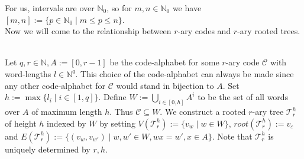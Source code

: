 \documentclass[12pt]{article}
\newcommand{\T}[0]{{\mathcal{T}_r^h}}
\newcommand{\ro}[0]{\textit{root}}
\newenvironment{statement3}[3]{\begin{trivlist}
\item[\hskip \labelsep {\bfseries #1}\hskip \labelsep {\bfseries #2} {#3}\textbf{.}]}{\end{trivlist}}
\begin{document}
For us, intervals are over $\mathbb{N}_0$, so for $m,n \in \mathbb{N}_0$ we have $[m,n] := \{p \in \mathbb{N}_0 \mid
m \leq p \leq n\}$.\\
Now we will come to the relationship between $r$-ary codes and $r$-ary rooted trees.

\begin{statement3}{(1.4)}{Definition}{(r-ary Trees from r-ary Codes)}\strut\\[2pt]
    Let $q,r \in \mathbb{N}, A := [0,r-1]$ be the code-alphabet for some $r$-ary code $\mathcal{C}$ with word-lengths
    $l \in \mathbb{N}^q$. This choice of the code-alphabet can always be made since any other code-alphabet
    for $\mathcal{C}$ would stand in bijection to $A$.
    Set $h := \max\{l_i \mid i \in [1,q]\}$.
    Define $W := \bigcup_{i \in [0,h]} A^i$ to be the set of all words over $A$ of maximum length $h$. Thus
    $\mathcal{C} \subseteq W$. We construct a rooted $r$-ary tree $\T$ of height $h$ indexed by $W$ by setting
    $V(\T) := \{v_w \mid w \in W\}$, $\ro(\T) := v_\varepsilon$ and
    $E(\T) := \{(v_w,v_{w'}) \mid w,w' \in W, wx = w', x\in A\}$. Note that $\T$ is uniquely determined by $r,h$.
\end{statement3}
\end{document}
